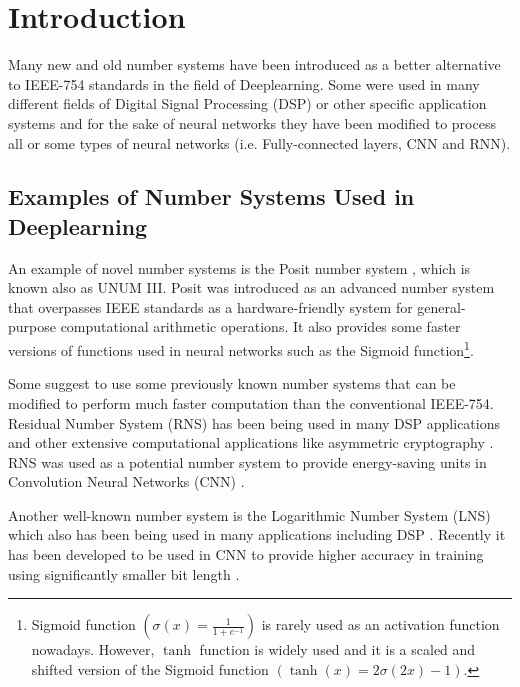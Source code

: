 \section{Introduction}

Many new and old number systems have been introduced as a better alternative to IEEE-754 standards \cite{754} in the field of Deeplearning. Some were used in many different fields of Digital Signal Processing (DSP) or other specific application systems and for the sake of neural networks they have been modified to process all or some types of neural networks (i.e. Fully-connected layers, CNN and RNN).

\subsection{Examples of Number Systems Used in Deeplearning}

An example of novel number systems is the Posit number system \cite{Gustafson2017}, which is known also as UNUM III. Posit was introduced as an advanced number system that overpasses IEEE standards as a hardware-friendly system for general-purpose computational arithmetic operations. It also provides some faster versions of functions used in neural networks such as the Sigmoid function\footnote{Sigmoid function $\left(\sigma(x) = \frac{1}{1 + e^{-1}}\right)$ is rarely used as an activation function nowadays. However, $\tanh$ function is widely used and it is a scaled and shifted version of the Sigmoid function $\left(\tanh(x) = 2 \sigma(2x) -1\right)$.}.

Some suggest to use some previously known number systems that can be modified to perform much faster computation than the conventional IEEE-754. Residual Number System (RNS) \cite{Garner1959} has been being used in many DSP applications \cite{Cardarilli2007,Chaves2003,Claudio1995,DiClaudio1990,Jullien1987} and other extensive computational applications like asymmetric cryptography \cite{Hizzani2019,Asif2018a,Schinianakis2014,Antao2014}. RNS was used as a potential number system to provide energy-saving units in Convolution Neural Networks (CNN) \cite{Samimi2020}.

Another well-known number system is the Logarithmic Number System (LNS) \cite{Kingsbury1971,Alexopoulos1975,Lee1977} which also has been being used in many applications including DSP \cite{Dimitrov2001,Lewis1995}. Recently it has been developed to be used in CNN to provide higher accuracy in training using significantly smaller bit length \cite{Miyashita2016,Juang2019}.

